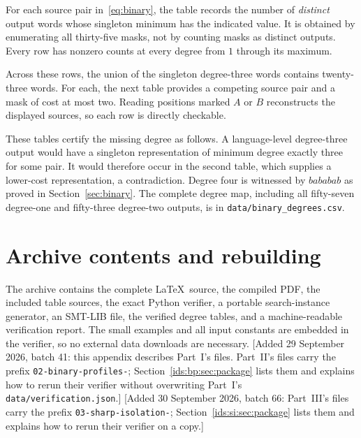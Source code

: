 \documentclass[11pt,letterpaper]{article}
\theoremstyle{definition}\newtheorem{definition}[theorem]{Definition}
\theoremstyle{remark}\newtheorem{remark}[theorem]{Remark}
\theoremstyle{definition}\newtheorem{question}[theorem]{Question}
\begin{document}
For each source pair in~\eqref{eq:binary}, the table records the number of \emph{distinct} output words whose singleton minimum has the indicated value. It is obtained by enumerating all thirty-five masks, not by counting masks as distinct outputs. Every row has nonzero counts at every degree from $1$ through its maximum.



Across these rows, the union of the singleton degree-three words contains twenty-three words. For each, the next table provides a competing source pair and a mask of cost at most two. Reading positions marked $A$ or $B$ reconstructs the displayed sources, so each row is directly checkable.



These tables certify the missing degree as follows. A language-level degree-three output would have a singleton representation of minimum degree exactly three for some pair. It would therefore occur in the second table, which supplies a lower-cost representation, a contradiction. Degree four is witnessed by $bababab$ as proved in Section~\ref{sec:binary}. The complete degree map, including all fifty-seven degree-one and fifty-three degree-two outputs, is in \texttt{data/binary\_degrees.csv}.

\section{Archive contents and rebuilding}

The archive contains the complete \LaTeX\ source, the compiled PDF, the included table sources, the exact Python verifier, a portable search-instance generator, an SMT-LIB file, the verified degree tables, and a machine-readable verification report. The small examples and all input constants are embedded in the verifier, so no external data downloads are necessary.
[Added 29 September 2026, batch 41: this appendix describes Part~I's files. Part~II's files carry the prefix \texttt{02-binary-profiles-}; Section~\ref{ids:bp:sec:package} lists them and explains how to rerun their verifier without overwriting Part~I's \texttt{data/verification.json}.]
[Added 30 September 2026, batch 66: Part~III's files carry the prefix \texttt{03-sharp-isolation-}; Section~\ref{ids:si:sec:package} lists them and explains how to rerun their verifier on a copy.]
\end{document}
